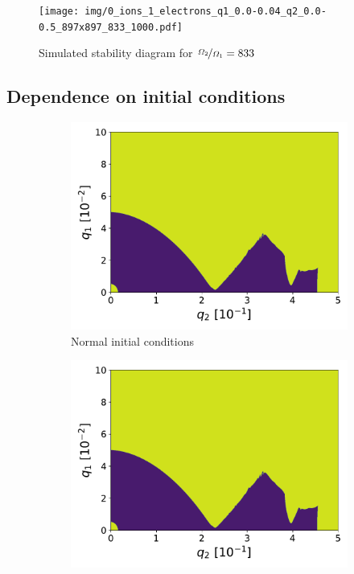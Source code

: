 \begin{figure}[H]
	\centering
	\texttt{[image: img/0\_ions\_1\_electrons\_q1\_0.0-0.04\_q2\_0.0-0.5\_897x897\_833\_1000.pdf]}
	\caption{Simulated stability diagram for $\nicefrac{\Omega_2}{\Omega_1} = 833$}
	\label{fig:stabil-eta=833}
\end{figure}

\subsection{Dependence on initial conditions}


\begin{figure}[H]
\begin{subfigure}{.3\textwidth}
  \centering
  \includegraphics[width=\linewidth]{img/0_ions_1_electrons_q1_0.0-0.1_q2_0.0-0.5_960x960_3.pdf}
  \caption{Normal initial conditions}
  \label{fig:normal_conds-3}
\end{subfigure}%
\begin{subfigure}{.3\textwidth}
  \centering
  \includegraphics[width=\linewidth]{img/0_ions_1_electrons_q1_0.0-0.1_q2_0.0-0.5_960x960_3.pdf}

\end{subfigure}
\end{figure}
